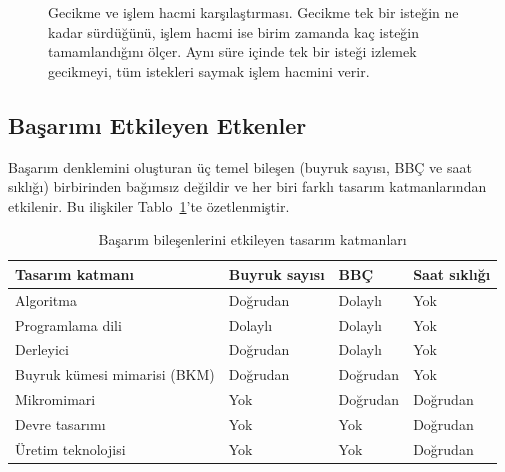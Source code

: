 \begin{figure}[H]
\caption[Gecikme ve işlem hacmi karşılaştırması]{Gecikme ve işlem hacmi karşılaştırması. Gecikme tek bir isteğin ne kadar sürdüğünü, işlem hacmi ise birim zamanda kaç isteğin tamamlandığını ölçer. Aynı süre içinde tek bir isteği izlemek gecikmeyi, tüm istekleri saymak işlem hacmini verir.}
\label{fig:gecikme-islemhacmi}
\end{figure}


\subsection{Başarımı Etkileyen Etkenler}
\label{subsec:basarim-faktorleri}

Başarım denklemini oluşturan üç temel bileşen (buyruk sayısı, BBÇ ve saat sıklığı) birbirinden bağımsız değildir ve her biri farklı tasarım katmanlarından etkilenir. Bu ilişkiler Tablo~\ref{tab:basarim-etki}'te özetlenmiştir.

\begin{table}[H]
\centering
\caption{Başarım bileşenlerini etkileyen tasarım katmanları}
\label{tab:basarim-etki}
\small
\begin{tabular}{lp{3.2cm}p{3.2cm}p{3.2cm}}
\toprule
\textbf{Tasarım katmanı} & \textbf{Buyruk sayısı} & \textbf{BBÇ} & \textbf{Saat sıklığı} \\
\midrule
Algoritma      & Doğrudan   & Dolaylı    & Yok         \\
Programlama dili & Dolaylı & Dolaylı    & Yok         \\
Derleyici      & Doğrudan   & Dolaylı    & Yok         \\
Buyruk kümesi mimarisi (BKM) & Doğrudan & Doğrudan & Yok         \\
Mikromimari    & Yok        & Doğrudan   & Doğrudan    \\
Devre tasarımı & Yok        & Yok        & Doğrudan    \\
Üretim teknolojisi & Yok   & Yok        & Doğrudan    \\
\bottomrule
\end{tabular}
\end{table}

